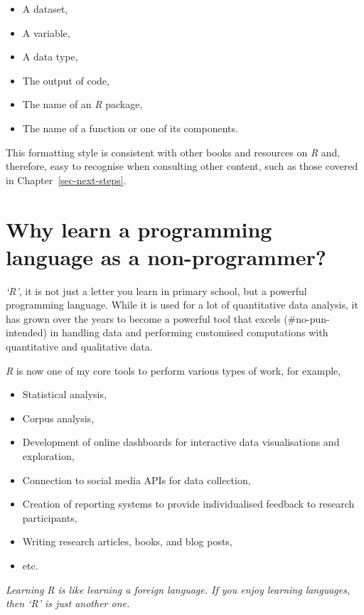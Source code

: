 \documentclass[
  letterpaper,
]{krantz}
\providecommand{\tightlist}{%
  \setlength{\itemsep}{0pt}\setlength{\parskip}{0pt}}\usepackage{longtable,booktabs,array}
\renewenvironment{quote}{\begin{VF}}{\end{VF}}
\begin{document}
\begin{itemize}
\item
  A dataset,
\item
  A variable,
\item
  A data type,
\item
  The output of code,
\item
  The name of an \emph{R} package,
\item
  The name of a function or one of its components.
\end{itemize}

This formatting style is consistent with other books and resources on
\emph{R} and, therefore, easy to recognise when consulting other
content, such as those covered in Chapter~\ref{sec-next-steps}.


\chapter{Why learn a programming language as a
non-programmer?}\label{sec-why-learn-a-programming-language-as-a-non-programmer}

\emph{`R'}, it is not just a letter you learn in primary school, but a
powerful programming language. While it is used for a lot of
quantitative data analysis, it has grown over the years to become a
powerful tool that excels (\#no-pun-intended) in handling data and
performing customised computations with quantitative and qualitative
data.

\emph{R} is now one of my core tools to perform various types of work,
for example,

\begin{itemize}
\tightlist
\item
  Statistical analysis,
\item
  Corpus analysis,
\item
  Development of online dashboards for interactive data visualisations
  and exploration,
\item
  Connection to social media APIs for data collection,
\item
  Creation of reporting systems to provide individualised feedback to
  research participants,
\item
  Writing research articles, books, and blog posts,
\item
  etc.
\end{itemize}

\begin{quote}
\emph{Learning R is like learning a foreign language. If you enjoy
learning languages, then `R' is just another one.}
\end{quote}
\end{document}
